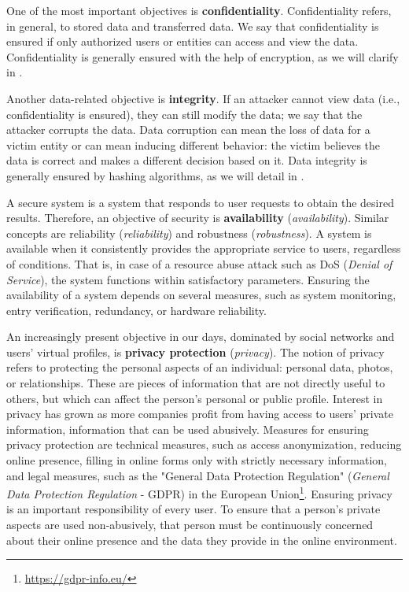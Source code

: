 One of the most important objectives is \textbf{confidentiality}.
Confidentiality refers, in general, to stored data and transferred data.
We say that confidentiality is ensured if only authorized users or entities can access and view the data.
Confidentiality is generally ensured with the help of encryption, as we will clarify in .

Another data-related objective is \textbf{integrity}.
If an attacker cannot view data (i.e., confidentiality is ensured), they can still modify the data;
we say that the attacker corrupts the data.
Data corruption can mean the loss of data for a victim entity or can mean inducing different behavior: the victim believes the data is correct and makes a different decision based on it.
Data integrity is generally ensured by hashing algorithms, as we will detail in .

A secure system is a system that responds to user requests to obtain the desired results.
Therefore, an objective of security is \textbf{availability} (\textit{availability}).
Similar concepts are reliability (\textit{reliability}) and robustness (\textit{robustness}).
A system is available when it consistently provides the appropriate service to users, regardless of conditions.
That is, in case of a resource abuse attack such as DoS (\textit{Denial of Service}), the system functions within satisfactory parameters.
Ensuring the availability of a system depends on several measures, such as system monitoring, entry verification, redundancy, or hardware reliability.

An increasingly present objective in our days, dominated by social networks and users' virtual profiles, is \textbf{privacy protection} (\textit{privacy}).
The notion of privacy refers to protecting the personal aspects of an individual: personal data, photos, or relationships.
These are pieces of information that are not directly useful to others, but which can affect the person's personal or public profile.
Interest in privacy has grown as more companies profit from having access to users' private information, information that can be used abusively.
Measures for ensuring privacy protection are technical measures, such as access anonymization, reducing online presence, filling in online forms only with strictly necessary information, and legal measures, such as the "General Data Protection Regulation" (\textit{General Data Protection Regulation} - GDPR) in the European Union\footnote{\url{https://gdpr-info.eu/}}.
Ensuring privacy is an important responsibility of every user.
To ensure that a person's private aspects are used non-abusively, that person must be continuously concerned about their online presence and the data they provide in the online environment.

